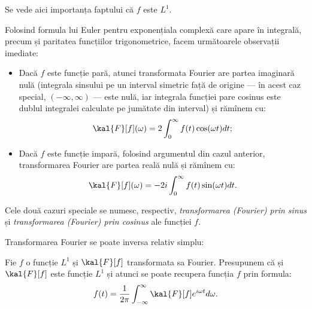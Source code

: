 
Se vede aici importanța faptului că $ f $ este $ L^1 $.

Folosind formula lui Euler pentru exponențiala complexă care apare în
integrală, precum și paritatea funcțiilor trigonometrice, facem următoarele
observații imediate:
\begin{itemize}
    \item Dacă $ f $ este funcție pară, atunci transformata Fourier are partea
        imaginară nulă (integrala sinsului pe un interval simetric față de origine ---
        în acest caz special, $ (-\infty, \infty) $ --- este nulă, iar integrala
        funcției pare cosinus este dublul integralei calculate pe jumătate din
        interval) și rămînem cu:
        \[
            \kal{F}[f](\omega) = 2 \int_0^\infty f(t)\cos(\omega t) dt;
        \]
    \item Dacă $ f $ este funcție impară, folosind argumentul din cazul anterior,
        transformarea Fourier are partea reală nulă și rămînem cu:
        \[
            \kal{F}[f](\omega) = -2i \int_0^\infty f(t) \sin (\omega t) dt.
        \]
\end{itemize}

Cele două cazuri speciale se numesc, respectiv, \emph{transformarea (Fourier) prin sinus}
și \emph{transformarea (Fourier) prin cosinus} ale funcției $ f $.

Transformarea Fourier se poate inversa relativ simplu:
\begin{theorem}\label{thm:fourier-inv}
    Fie $ f $ o funcție $ L^1 $ și $ \kal{F}[f] $ transformata sa Fourier.
    Presupunem că și $ \kal{F}[f] $ este funcție $ L^1 $ și atunci
    se poate recupera funcția $ f $ prin formula:
    \[
        f(t) = \dfrac{1}{2 \pi} \int_{-\infty}^\infty \kal{F}[f]e^{i\omega t}d\omega.
    \]
\end{theorem}

